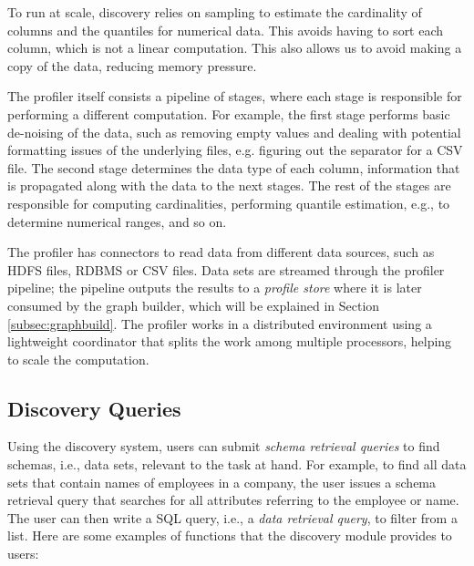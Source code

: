 
To run at scale, discovery relies on sampling to estimate the cardinality of
columns and the quantiles for numerical data. This avoids having to sort each
column, which is not a linear computation.  This also allows us to avoid making a copy of
the data,  reducing memory pressure.

The profiler itself consists a pipeline of stages, where each stage is
responsible for performing a different computation. For example, the first stage
performs basic de-noising of the data, such as removing empty values and dealing
with potential formatting issues of the underlying files, e.g. figuring out the
separator for a CSV file.  The second stage determines the data type of each column,
information that is propagated along with the data to the next stages. The rest
of the stages are responsible for computing cardinalities, performing quantile
estimation, e.g., to determine numerical ranges, and so on.

The profiler has connectors to read data from different data sources, such as
HDFS files, RDBMS or CSV files. Data sets are streamed through the profiler
pipeline;  the pipeline outputs the results
to a {\it profile store} where it is later consumed by the graph builder, which will be
explained in Section \ref{subsec:graphbuild}.
The profiler works in a distributed environment using a lightweight coordinator
that splits the work among multiple processors, helping to scale the
computation.



\subsection{Discovery Queries}
\label{subsec:api}

Using the discovery system, users can submit \emph{schema retrieval queries}
to find schemas, i.e., data sets, relevant to the task at hand. 
For example, to find all data sets that contain names of
employees in a company, the user issues a schema retrieval query that searches for all
attributes referring to the employee or name.
The user can then write a SQL query, i.e., a \emph{data retrieval query}, to filter from a list. 
Here are some examples of functions that the discovery module provides to users:

